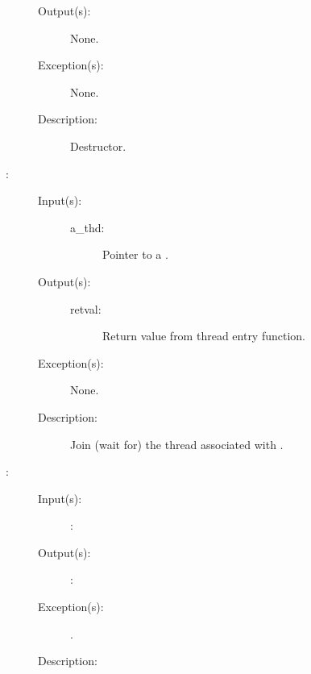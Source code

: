 \begin{description}
\begin{description}
\begin{description}
		\end{description}
	\item[Output(s): ] None.
	\item[Exception(s): ] None.
	\item[Description: ]
		Destructor.
	\end{description}
\label{thd_join}
\item[{\cfunc[void *]{thd\_join}{cw\_thd\_t *a\_thd}}: ]
	\begin{description}\item[]
	\item[Input(s): ]
		\begin{description}\item[]
		\item[a\_thd: ] Pointer to a .
		\end{description}
	\item[Output(s): ]
		\begin{description}\item[]
		\item[retval: ]
			Return value from thread entry function.
		\end{description}
	\item[Exception(s): ] None.
	\item[Description: ]
		Join (wait for) the thread associated with .
	\end{description}
\label{thd_}
\item[{\cfunc[]{thd\_}{}}: ]
	\begin{description}\item[]
	\item[Input(s): ]
		\begin{description}\item[]
		\item[: ]
		\end{description}
	\item[Output(s): ]
		\begin{description}\item[]
		\item[: ]
		\end{description}
	\item[Exception(s): ]
		\begin{description}\item[]
		\item[.]
		\end{description}
	\item[Description: ]

\end{description}
\end{description}
